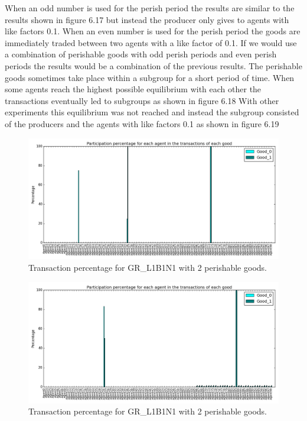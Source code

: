 \documentclass[twoside,openright]{uva-bachelor-thesis}
\begin{document}
\begin{description}
When an odd number is used for the perish period the results are similar to the results shown in figure 6.17 but instead the producer only gives to agents with like factors 0.1. When an even number is used for the perish period the goods are immediately traded between two agents with a like factor of 0.1. If we would use a combination of perishable goods with odd perish periods and even perish periods the results would be a combination of the previous results. The perishable goods sometimes take place within a subgroup for a short period of time. When some agents reach the highest possible equilibrium with each other the transactions eventually led to subgroups as shown in figure 6.18 With other experiments this equilibrium was not reached and instead the subgroup consisted of the producers and the agents with like factors 0.1 as shown in figure 6.19 \\
\begin{figure}[h!]
\centering
\includegraphics[scale=0.4]{Simulation_figures/GR_L1B1N1/2perishable_2233_100k}
\caption{Transaction percentage for GR\_L1B1N1 with 2 perishable goods.}
\end{figure}
\begin{figure}[h!]
\centering
\includegraphics[scale=0.4]{Simulation_figures/GR_L1B1N1/2perishable_largercommunity}
\caption{Transaction percentage for GR\_L1B1N1 with 2 perishable goods.}
\end{figure}


\end{description}
\end{document}
